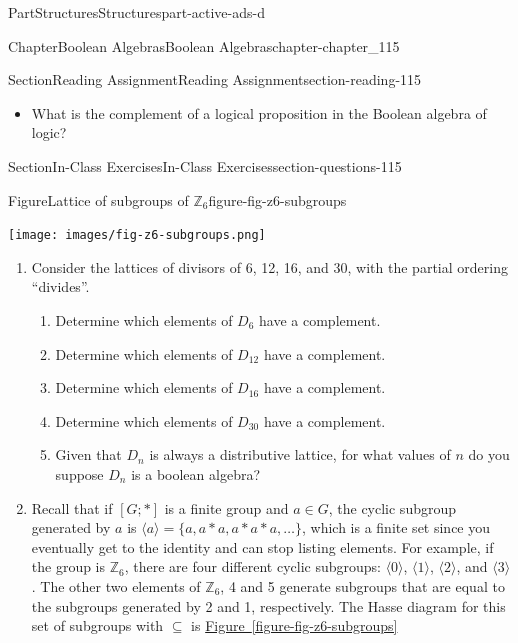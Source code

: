 \documentclass[oneside,10pt,]{book}
\newcommand{\xreffont}{\relax}
\numberwithin{equation}{section}
\begin{document}
\begin{partptx}{Part}{Structures}{}{Structures}{}{}{part-active-ads-d}
\begin{chapterptx}{Chapter}{Boolean Algebras}{}{Boolean Algebras}{}{}{chapter-chapter_115}
\begin{sectionptx}{Section}{Reading Assignment}{}{Reading Assignment}{}{}{section-reading-115}
\begin{itemize}[label=\textbullet]
\item{}What is the complement of a logical proposition in the Boolean algebra of logic?%
\end{itemize}
%
\end{sectionptx}
%
%
\typeout{************************************************}
\typeout{************************************************}
%
\begin{sectionptx}{Section}{In-Class Exercises}{}{In-Class Exercises}{}{}{section-questions-115}
\begin{figureptx}{Figure}{Lattice of subgroups of \(\mathbb{Z}_{6}\)}{figure-fig-z6-subgroups}{}%
\begin{image}{0.3}{0.4}{0.3}{}%
\texttt{[image: images/fig-z6-subgroups.png]}
\end{image}%
\tcblower
\end{figureptx}%
%
\begin{enumerate}[label=\arabic*.]
\item{}Consider the lattices of divisors of 6, 12, 16, and 30, with the partial ordering ``divides''.%
\begin{enumerate}[label=(\alph*)]
\item{}Determine which elements of \(D_6\) have a complement.%
\item{}Determine which elements of \(D_{12}\) have a complement.%
\item{}Determine which elements of \(D_{16}\) have a complement.%
\item{}Determine which elements of \(D_{30}\) have a complement.%
\item{}Given that \(D_n\) is always a distributive lattice, for what values of \(n\) do you suppose \(D_n\) is a boolean algebra?%
\end{enumerate}
%
\item{}Recall that if \([G;*]\) is a finite group and \(a \in G\),  the cyclic subgroup generated by \(a\) is \(\langle a \rangle=\{a, a*a, a*a*a, \dots\}\), which is a finite set since you eventually get to the identity and can stop listing elements.  For example, if the group is \(\mathbb{Z}_{6}\), there are four different cyclic subgroups:  \(\langle 0 \rangle\), \(\langle 1 \rangle\), \(\langle 2 \rangle\), and \(\langle 3 \rangle\).  The other two elements of \(\mathbb{Z}_{6}\), 4 and 5 generate subgroups that are equal to the subgroups generated by 2 and 1, respectively.  The Hasse diagram for this set of subgroups with \(\subseteq\) is \hyperref[figure-fig-z6-subgroups]{Figure~{\xreffont\ref{figure-fig-z6-subgroups}}}%

\end{enumerate}
\end{sectionptx}
\end{chapterptx}
\end{partptx}
\end{document}
